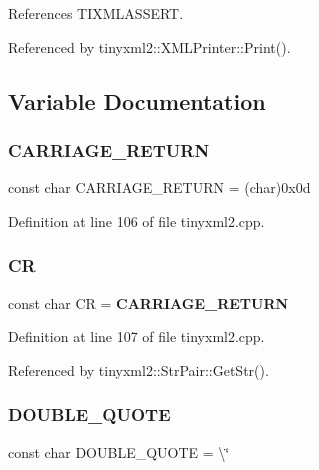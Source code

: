 References T\+I\+X\+M\+L\+A\+S\+S\+E\+RT.



Referenced by tinyxml2\+::\+X\+M\+L\+Printer\+::\+Print().



\subsection{Variable Documentation}
\mbox{\label{tinyxml2_8cpp_add686989707d784afa885cbb90910113}} 
\subsubsection{CARRIAGE\_RETURN}
{\footnotesize\ttfamily const char C\+A\+R\+R\+I\+A\+G\+E\+\_\+\+R\+E\+T\+U\+RN = (char)0x0d\hspace{0.3cm}{\ttfamily [static]}}



Definition at line 106 of file tinyxml2.\+cpp.

\mbox{\label{tinyxml2_8cpp_ad3136d2f1f34e592c66e09ba8a852812}} 
\subsubsection{CR}
{\footnotesize\ttfamily const char CR = \textbf{ C\+A\+R\+R\+I\+A\+G\+E\+\_\+\+R\+E\+T\+U\+RN}\hspace{0.3cm}{\ttfamily [static]}}



Definition at line 107 of file tinyxml2.\+cpp.



Referenced by tinyxml2\+::\+Str\+Pair\+::\+Get\+Str().

\mbox{\label{tinyxml2_8cpp_a2e3bbd17c0f4134dbd5bd8cfc5d0c3b2}} 
\subsubsection{DOUBLE\_QUOTE}
{\footnotesize\ttfamily const char D\+O\+U\+B\+L\+E\+\_\+\+Q\+U\+O\+TE = \textquotesingle{}\textbackslash{}\char`\"{}\textquotesingle{}\hspace{0.3cm}{\ttfamily [static]}}



